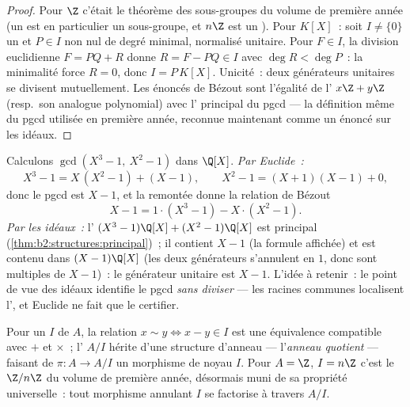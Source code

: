 \begin{proof}
Pour $\Z$ c'était le théorème des sous-groupes du volume de première
année (un  est en particulier un sous-groupe, et $n\Z$ est un
). Pour $K[X]$~: soit $I \neq \{0\}$ un  et $P \in I$ non nul
de degré minimal, normalisé unitaire. Pour $F \in I$, la division
euclidienne $F = PQ + R$ donne $R = F - PQ \in I$ avec $\deg R < \deg
P$~: la minimalité force $R = 0$, donc $I = P\,K[X]$. Unicité~: deux
générateurs unitaires se divisent mutuellement. Les énoncés de Bézout
sont l'égalité de l' $x\Z + y\Z$ (resp.\ son analogue polynomial)
avec l' principal du pgcd --- la définition même du pgcd utilisée
en première année, reconnue maintenant comme un énoncé sur les idéaux.
\end{proof}

\begin{example}\label{ex:b2:structures:polygcd}
Calculons $\gcd(X^3 - 1,\ X^2 - 1)$ dans $\Q[X]$. \emph{Par
Euclide~:}
\[
X^3 - 1 = X\,(X^2 - 1) + (X - 1),
\qquad
X^2 - 1 = (X + 1)(X - 1) + 0 ,
\]
donc le pgcd est $X - 1$, et la remontée donne la relation de
Bézout
\[
X - 1 = 1\cdot(X^3 - 1) - X\cdot(X^2 - 1).
\]
\emph{Par les idéaux~:} l' $(X^3 - 1)\Q[X] + (X^2 - 1)\Q[X]$
est principal (\cref{thm:b2:structures:principal})~; il contient $X
- 1$ (la formule affichée) et est contenu dans $(X - 1)\Q[X]$ (les
deux générateurs s'annulent en $1$, donc sont multiples de $X -
1$)~: le générateur unitaire est $X - 1$. L'idée à retenir~: le
point de vue des idéaux identifie le pgcd \emph{sans diviser} ---
les racines communes localisent l', et Euclide ne fait que le
certifier.
\end{example}

\begin{definition}\label{def:b2:structures:quotientring}
Pour un  $I$ de $A$, la relation $x \sim y \iff x - y \in I$ est
une équivalence compatible avec $+$ et $\times$~; l'
$A/I$ hérite d'une structure d'anneau --- l'\emph{anneau
quotient} --- faisant de $\pi \colon A \to A/I$
un morphisme de noyau $I$. Pour $A = \Z$, $I = n\Z$ c'est le
$\Z/n\Z$ du volume de première année, désormais muni de sa propriété
universelle~: tout morphisme annulant $I$ se factorise à travers $A/I$.
\end{definition}


